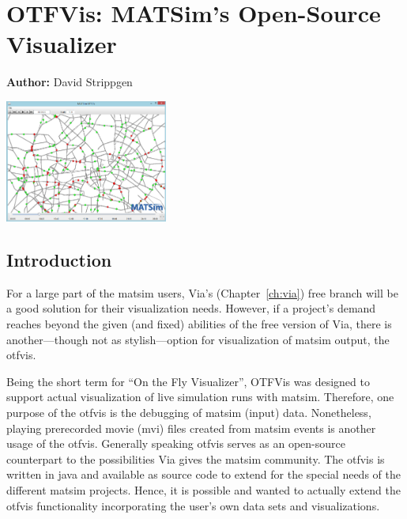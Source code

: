 \chapter{OTFVis: MATSim's Open-Source Visualizer}
\label{ch:otfvis}

\hfill \textbf{Author:} David Strippgen

\begin{center} \includegraphics[width=0.4\textwidth, angle=0]{extending/figures/otfvis/image06.png} \end{center}


\section{Introduction}
For a large part of the \gls{matsim} users, Via's (Chapter~\ref{ch:via}) free branch will be a good solution for their visualization needs. However, if a project's demand reaches beyond the given (and fixed) abilities of the free version of Via, there is another---though not as stylish---option for visualization of \gls{matsim} output, the \gls{otfvis}. 

Being the short term for ``On the Fly Visualizer'', OTFVis was designed to support actual visualization of live simulation runs with \gls{matsim}. Therefore, one purpose of the \gls{otfvis} is the debugging of \gls{matsim} (input) data. Nonetheless, playing prerecorded movie (\gls{mvi}) files created from \gls{matsim} events is another usage of the \gls{otfvis}. Generally speaking \gls{otfvis} serves as an open-source counterpart to the possibilities Via gives the \gls{matsim} community. The \gls{otfvis} is written in \gls{java} and available as source code to extend for the special needs of the different \gls{matsim} projects. Hence, it is possible and wanted to actually extend the \gls{otfvis} functionality incorporating the user's own data sets and visualizations.

